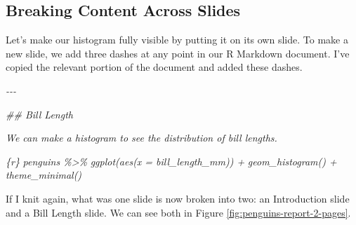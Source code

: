 \documentclass[
]{book}
\newenvironment{Shaded}{\begin{snugshade}}{\end{snugshade}}
\newcommand{\CommentTok}[1]{\textcolor[rgb]{0.56,0.35,0.01}{\textit{#1}}}
\begin{document}
\hypertarget{breaking-content-across-slides}{%
\subsection*{Breaking Content Across Slides}\label{breaking-content-across-slides}}

Let's make our histogram fully visible by putting it on its own slide. To make a new slide, we add three dashes at any point in our R Markdown document. I've copied the relevant portion of the document and added these dashes.

\begin{Shaded}
\begin{Highlighting}[]
\CommentTok{{-}{-}{-}}

\CommentTok{\#\# Bill Length}

\CommentTok{We can make a histogram to see the distribution of bill lengths.}

\CommentTok{\textasciigrave{}\textasciigrave{}\textasciigrave{}\{r\}}
\CommentTok{penguins \%\textgreater{}\% }
\CommentTok{  ggplot(aes(x = bill\_length\_mm)) +}
\CommentTok{  geom\_histogram() +}
\CommentTok{  theme\_minimal()}
\CommentTok{\textasciigrave{}\textasciigrave{}\textasciigrave{}}
\end{Highlighting}
\end{Shaded}

If I knit again, what was one slide is now broken into two: an Introduction slide and a Bill Length slide. We can see both in Figure \ref{fig:penguins-report-2-pages}.
\end{document}
